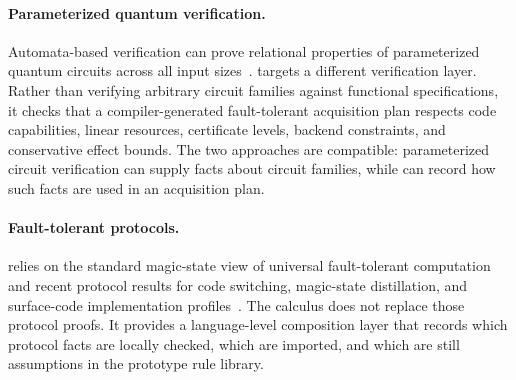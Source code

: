 \paragraph{Parameterized quantum verification.}
Automata-based verification can prove relational properties of parameterized quantum circuits across all input sizes~\cite{abdulla2026parameterized}.
\system targets a different verification layer.
Rather than verifying arbitrary circuit families against functional specifications, it checks that a compiler-generated fault-tolerant acquisition plan respects code capabilities, linear resources, certificate levels, backend constraints, and conservative effect bounds.
The two approaches are compatible: parameterized circuit verification can supply facts about circuit families, while \system can record how such facts are used in an acquisition plan.

\paragraph{Fault-tolerant protocols.}
\system relies on the standard magic-state view of universal fault-tolerant computation~\cite{bravyi2005magic} and recent protocol results for code switching, magic-state distillation, and surface-code implementation profiles~\cite{butt2024switching,heussen2025oneway,itogawa2025zero,wan2024constant}.
The calculus does not replace those protocol proofs.
It provides a language-level composition layer that records which protocol facts are locally checked, which are imported, and which are still assumptions in the prototype rule library.
